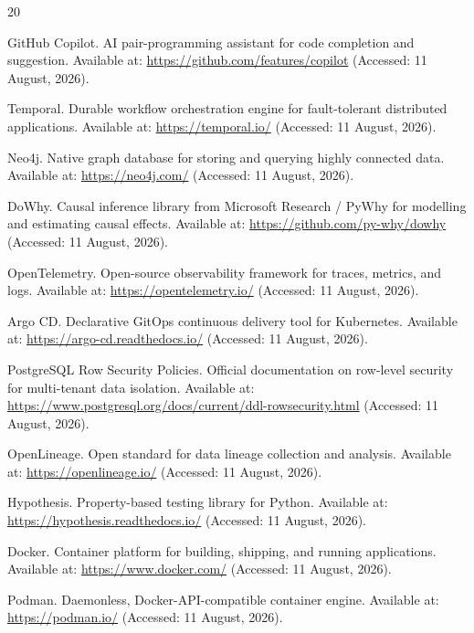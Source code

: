 \renewcommand{\bibname}{References}

\begin{thebibliography}{20}

GitHub Copilot. AI pair-programming assistant for code completion and suggestion. Available at: \url{https://github.com/features/copilot} (Accessed: 11 August, 2026).

Temporal. Durable workflow orchestration engine for fault-tolerant distributed applications. Available at: \url{https://temporal.io/} (Accessed: 11 August, 2026).

Neo4j. Native graph database for storing and querying highly connected data. Available at: \url{https://neo4j.com/} (Accessed: 11 August, 2026).

DoWhy. Causal inference library from Microsoft Research / PyWhy for modelling and estimating causal effects. Available at: \url{https://github.com/py-why/dowhy} (Accessed: 11 August, 2026).

OpenTelemetry. Open-source observability framework for traces, metrics, and logs. Available at: \url{https://opentelemetry.io/} (Accessed: 11 August, 2026).

Argo CD. Declarative GitOps continuous delivery tool for Kubernetes. Available at: \url{https://argo-cd.readthedocs.io/} (Accessed: 11 August, 2026).

PostgreSQL Row Security Policies. Official documentation on row-level security for multi-tenant data isolation. Available at: \url{https://www.postgresql.org/docs/current/ddl-rowsecurity.html} (Accessed: 11 August, 2026).

OpenLineage. Open standard for data lineage collection and analysis. Available at: \url{https://openlineage.io/} (Accessed: 11 August, 2026).

Hypothesis. Property-based testing library for Python. Available at: \url{https://hypothesis.readthedocs.io/} (Accessed: 11 August, 2026).

Docker. Container platform for building, shipping, and running applications. Available at: \url{https://www.docker.com/} (Accessed: 11 August, 2026).

Podman. Daemonless, Docker-API-compatible container engine. Available at: \url{https://podman.io/} (Accessed: 11 August, 2026).


\end{thebibliography}
